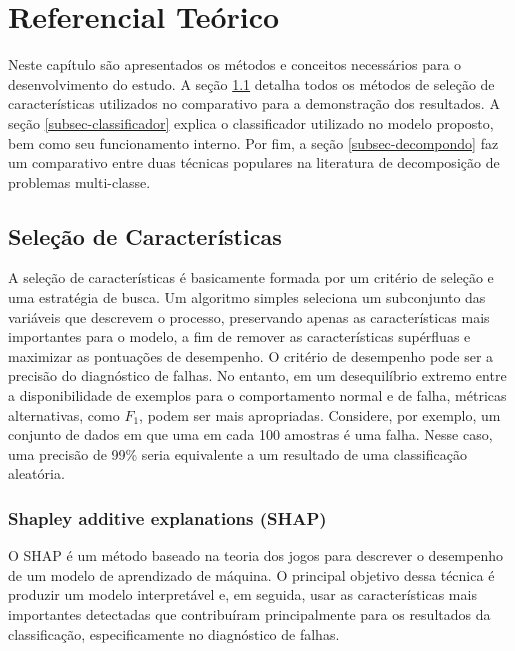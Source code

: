 \chapter{Referencial Teórico}
\label{sec-referencial}

Neste capítulo são apresentados os métodos e conceitos necessários para o desenvolvimento do estudo. A seção \ref{subsec-caracteristicas} detalha todos os métodos de seleção de características utilizados no comparativo para a demonstração dos resultados. A seção \ref{subsec-classificador} explica o classificador utilizado no modelo proposto, bem como seu funcionamento interno. Por fim, a seção \ref{subsec-decompondo} faz um comparativo entre duas técnicas populares na literatura de decomposição de problemas multi-classe.

\section{Seleção de Características}
\label{subsec-caracteristicas}

A seleção de características é basicamente formada por um critério de seleção e uma estratégia de busca. Um algoritmo simples seleciona um subconjunto das variáveis que descrevem o processo, preservando apenas as características mais importantes para o modelo, a fim de remover as características supérfluas e maximizar as pontuações de desempenho. O critério de desempenho pode ser a precisão do diagnóstico de falhas. No entanto, em um desequilíbrio extremo entre a disponibilidade de exemplos para o comportamento normal e de falha, métricas alternativas, como $F_{1}$, podem ser mais apropriadas. Considere, por exemplo, um conjunto de dados em que uma em cada 100 amostras é uma falha. Nesse caso, uma precisão de 99\% seria equivalente a um resultado de uma classificação aleatória.

\subsection{Shapley additive explanations (SHAP)}

O SHAP é um método baseado na teoria dos jogos para descrever o desempenho de um modelo de aprendizado de máquina. O principal objetivo dessa técnica é produzir um modelo interpretável e, em seguida, usar as características mais importantes detectadas que contribuíram principalmente para os resultados da classificação, especificamente no diagnóstico de falhas.

